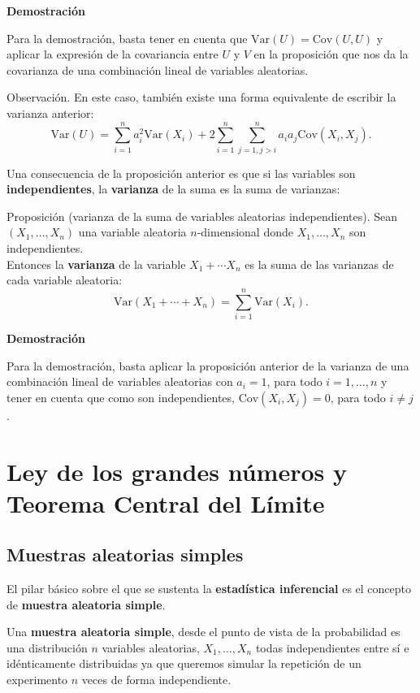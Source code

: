 \documentclass[]{book}
\begin{document}
\textbf{Demostración}

Para la demostración, basta tener en cuenta que \(\mathrm{Var}(U)=\mathrm{Cov}(U,U)\) y aplicar la expresión de la covariancia entre \(U\) y \(V\) en la proposición que nos da la covarianza de una combinación lineal de variables aleatorias.

 Observación.
En este caso, también existe una forma equivalente de escribir la varianza anterior:
\[
\mathrm{Var}(U)=\sum_{i=1}^n a_i^2 \mathrm{Var}(X_i)+2\sum_{i=1}^n\sum_{j=1,j>i}^n a_i a_j \mathrm{Cov}(X_i,X_j).
\]

Una consecuencia de la proposición anterior es que si las variables son \textbf{independientes}, la \textbf{varianza} de la suma es la suma de varianzas:

Proposición (varianza de la suma de variables aleatorias independientes).
Sean \((X_1,\ldots,X_n)\) una variable aleatoria \(n\)-dimensional donde \(X_1,\ldots, X_n\) son independientes.\\
Entonces la \textbf{varianza} de la variable \(X_1+\cdots X_n\) es la suma de las varianzas de cada variable aleatoria:
\[
\mathrm{Var}(X_1+\cdots + X_n)=\sum_{i=1}^n \mathrm{Var}(X_i).
\]

\textbf{Demostración}

Para la demostración, basta aplicar la proposición anterior de la varianza de una combinación lineal de variables aleatorias con \(a_i=1\), para todo \(i=1,\ldots,n\) y tener en cuenta que como son independientes, \(\mathrm{Cov}(X_i,X_j)=0\), para todo \(i\neq j\).

\hypertarget{ley-de-los-grandes-nuxfameros-y-teorema-central-del-luxedmite}{%
\chapter{Ley de los grandes números y Teorema Central del Límite}\label{ley-de-los-grandes-nuxfameros-y-teorema-central-del-luxedmite}}

\hypertarget{muestras-aleatorias-simples}{%
\section{Muestras aleatorias simples}\label{muestras-aleatorias-simples}}

El pilar básico sobre el que se sustenta la \textbf{estadística inferencial} es el concepto de \textbf{muestra aleatoria simple}.

Una \textbf{muestra aleatoria simple}, desde el punto de vista de la probabilidad es una distribución \(n\) variables aleatorias, \(X_1,\ldots, X_n\) todas independientes entre sí e idénticamente distribuidas ya que queremos simular la repetición de un experimento \(n\) veces de forma independiente.
\end{document}

